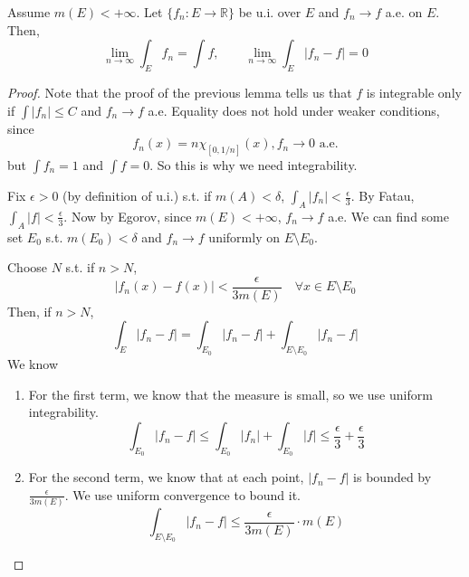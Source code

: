   \begin{theorem}
    Assume $m(E) < +\infty$. Let $\{f_n: E \to \mathbb{R}\}$ be u.i. over $E$ and $f_n \to f$ a.e. on $E$. Then, 
    \begin{equation}
      \lim_{n \to \infty} \int_E f_n = \int f, \qquad \lim_{n \to \infty} \int_E |f_n - f| = 0
    \end{equation}
  \end{theorem}
  \begin{proof}
    Note that the proof of the previous lemma tells us that $f$ is integrable only if $\int |f_n| \leq C$ and $f_n \to f$ a.e. Equality does not hold under weaker conditions, since 
    \begin{equation}
      f_n (x) = n \chi_{[0, 1/n]} (x), f_n \to 0 \text{ a.e.}
    \end{equation}
    but $\int f_n = 1$ and $\int f = 0$. So this is why we need integrability. 

    Fix $\epsilon > 0$ (by definition of u.i.) s.t. if $m(A) < \delta$, $\int_A |f_n| < \frac{\epsilon}{3}$. By Fatau, $\int_A |f| < \frac{\epsilon}{3}$. Now by Egorov, since $m(E) < +\infty$, $f_n \to f$ a.e. We can find some set $E_0$ s.t. $m(E_0) < \delta$ and $f_n \to f$ uniformly on $E \setminus E_0$. 

    Choose $N$ s.t. if $n > N$, 
    \begin{equation}
      |f_n (x) - f(x)| < \frac{\epsilon}{3 m(E)} \quad \forall x \in E \setminus E_0
    \end{equation}
    Then, if $n > N$, 
    \begin{equation}
      \int_E |f_n - f| = \int_{E_0} |f_n - f| + \int_{E \setminus E_0} |f_n - f|
    \end{equation}
    We know 
    \begin{enumerate}
      \item For the first term, we know that the measure is small, so we use uniform integrability. 
      \begin{equation}
        \int_{E_0} |f_n - f| \leq \int_{E_0} |f_n| + \int_{E_0} |f| \leq \frac{\epsilon}{3} + \frac{\epsilon}{3} 
      \end{equation}

      \item For the second term, we know that at each point, $|f_n - f|$ is bounded by $\frac{\epsilon}{3 m(E)}$. We use uniform convergence to bound it. 
      \begin{equation}
        \int_{E \setminus E_0} |f_n - f| \leq \frac{\epsilon}{3 m(E)} \cdot m(E)
      \end{equation}
    \end{enumerate}
  \end{proof}


